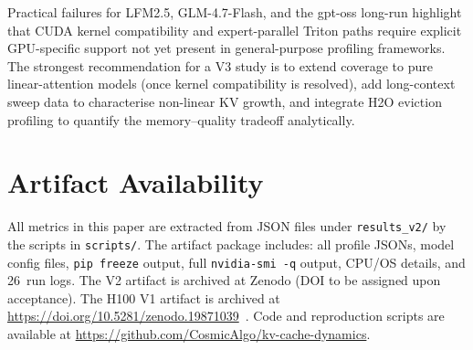 \documentclass[11pt,a4paper]{article}
\newcommand{\code}[1]{\texttt{#1}}
\begin{document}
Practical failures for LFM2.5, GLM-4.7-Flash, and the gpt-oss
long-run highlight that CUDA kernel compatibility and
expert-parallel Triton paths require explicit GPU-specific
support not yet present in general-purpose profiling frameworks.
The strongest recommendation for a V3 study is to extend coverage
to pure linear-attention models (once kernel compatibility is
resolved), add long-context sweep data to characterise
non-linear KV growth, and integrate H2O eviction profiling to
quantify the memory--quality tradeoff analytically.

\section*{Artifact Availability}
\label{sec:artifacts}

All metrics in this paper are extracted from JSON files under
\texttt{results\_v2/} by the scripts in \texttt{scripts/}.
The artifact package includes: all profile JSONs, model config
files, \code{pip freeze} output, full \code{nvidia-smi -q}
output, CPU/OS details, and 26~run logs.
The V2 artifact is archived at Zenodo (DOI to be assigned upon
acceptance).
The H100 V1 artifact is archived at
\url{https://doi.org/10.5281/zenodo.19871039}~\cite{kvscope2026h100}.
Code and reproduction scripts are available at
\url{https://github.com/CosmicAlgo/kv-cache-dynamics}.

\printbibliography
\end{document}
